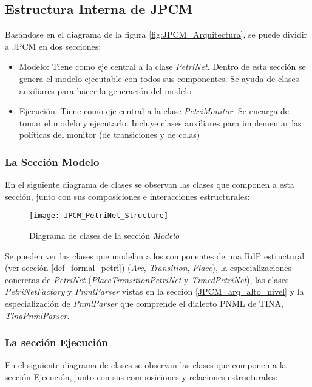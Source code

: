 \subsection{Estructura Interna de JPCM}
Basándose en el diagrama de la figura \ref{fig:JPCM_Arquitectura}, se puede
dividir a JPCM en dos secciones:
\begin{itemize}
    \item Modelo: Tiene como eje central a la clase \textit{PetriNet}. Dentro de
    esta sección se genera el modelo ejecutable con todos sus componentes. Se ayuda
    de clases auxiliares para hacer la generación del modelo
    \item Ejecución: Tiene como eje central a la clase \textit{PetriMonitor}. Se
    encarga de tomar el modelo y ejecutarlo. Incluye clases auxiliares para
    implementar las políticas del monitor (de transiciones y de colas)
\end{itemize}

\subsubsection{La Sección Modelo}
En el siguiente diagrama de clases se observan las clases que componen a esta
sección, junto con sus composiciones e interacciones estructurales:

\begin{figure}[H]
  \hspace*{-3cm}
  \texttt{[image: JPCM\_PetriNet\_Structure]}
  \caption{Diagrama de clases de la sección \textit{Modelo}}
  \label{fig:JPCM_PetriNet_Structure}
\end{figure}

Se pueden ver las clases que modelan a los componentes de una RdP estructural
(ver sección \ref{def_formal_petri}) (\textit{Arc}, \textit{Transition},
\textit{Place}), la especializaciones concretas de \textit{PetriNet}
(\textit{PlaceTransitionPetriNet} y \textit{TimedPetriNet}), las clases
\textit{PetriNetFactory} y \textit{PnmlParser} vistas en la sección
\ref{JPCM_arq_alto_nivel} y la especialización de \textit{PnmlParser} que
comprende el dialecto PNML de TINA, \textit{TinaPnmlParser}.

\subsubsection{La sección Ejecución}
En el siguiente diagrama de clases se observan las clases que componen a la
sección Ejecución, junto con sus composiciones y relaciones estructurales:

